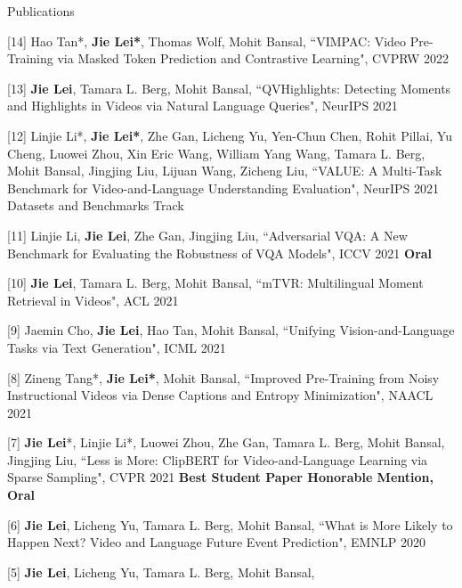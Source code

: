 \documentclass{resume} %
\begin{document}
\begin{rSection}{Publications}
    \item {[14] Hao Tan*, \textbf{Jie Lei*}, Thomas Wolf, Mohit Bansal,
            ``VIMPAC: Video Pre-Training via Masked Token Prediction and Contrastive Learning",
            CVPRW 2022
            }         
    \item {[13] \textbf{Jie Lei}, Tamara L. Berg, Mohit Bansal,
            ``QVHighlights: Detecting Moments and Highlights in Videos via Natural Language Queries",
            NeurIPS 2021
            }              
    \item {[12] Linjie Li*, \textbf{Jie Lei*}, Zhe Gan, Licheng Yu, Yen-Chun Chen, Rohit Pillai, Yu Cheng, Luowei Zhou, Xin Eric Wang, William Yang Wang, Tamara L. Berg, Mohit Bansal, Jingjing Liu, Lijuan Wang, Zicheng Liu,
            ``VALUE: A Multi-Task Benchmark for Video-and-Language Understanding Evaluation",
            NeurIPS 2021 Datasets and Benchmarks Track 
            }            
    \item {[11] Linjie Li, \textbf{Jie Lei}, Zhe Gan, Jingjing Liu,
            ``Adversarial VQA: A New Benchmark for Evaluating the Robustness of VQA Models",
            ICCV 2021 {\color{bittersweet}\textbf{Oral}} 
            }              
    \item {[10] \textbf{Jie Lei}, Tamara L. Berg, Mohit Bansal,
            ``mTVR: Multilingual Moment Retrieval in Videos",
            ACL 2021
            }        
    \item {[9] Jaemin Cho, \textbf{Jie Lei}, Hao Tan, Mohit Bansal,
            ``Unifying Vision-and-Language Tasks via Text Generation",
            ICML 2021
            }       
    \item {[8] Zineng Tang*, \textbf{Jie Lei*}, Mohit Bansal,
            ``Improved Pre-Training from Noisy Instructional Videos via Dense Captions and Entropy Minimization",
            NAACL 2021  
            }               
    \item {[7] \textbf{Jie Lei}*, Linjie Li*, Luowei Zhou, Zhe Gan, Tamara L. Berg, Mohit Bansal, Jingjing Liu,
            ``Less is More: ClipBERT for Video-and-Language Learning via Sparse Sampling",
            CVPR 2021 {\color{bittersweet}\textbf{Best Student Paper Honorable Mention, Oral}}    
            }                  
    \item {[6] \textbf{Jie Lei}, Licheng Yu, Tamara L. Berg, Mohit Bansal,
            ``What is More Likely to Happen Next? Video and Language Future Event Prediction",
            EMNLP 2020    
            }    
   \item {[5] \textbf{Jie Lei}, Licheng Yu, Tamara L. Berg, Mohit Bansal,
}
\end{rSection}
\end{document}
